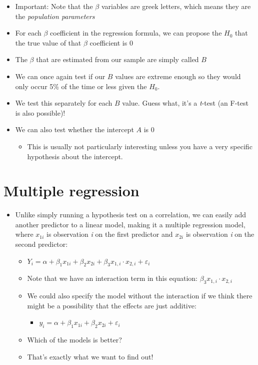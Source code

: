 \documentclass[]{article}
\providecommand{\tightlist}{%
  \setlength{\itemsep}{0pt}\setlength{\parskip}{0pt}}
\begin{document}
\begin{itemize}
\tightlist
\item
  Important: Note that the \(\beta\) variables are greek letters, which
  means they are the \emph{population parameters}
\item
  For each \(\beta\) coefficient in the regression formula, we can
  propose the \(H_0\) that the true value of that \(\beta\) coefficient
  is 0
\item
  The \(\beta\) that are estimated from our sample are simply called
  \(B\)
\item
  We can once again test if our \(B\) values are extreme enough so they
  would only occur 5\% of the time or less given the \(H_0\).
\item
  We test this separately for each \(B\) value. Guess what, it's a
  \emph{t}-test (an F-test is also possible)!
\item
  We can also test whether the intercept \(A\) is 0

  \begin{itemize}
  \tightlist
  \item
    This is usually not particularly interesting unless you have a very
    specific hypothesis about the intercept.
  \end{itemize}
\end{itemize}

\section{Multiple regression}\label{multiple-regression}

\begin{itemize}
\tightlist
\item
  Unlike simply running a hypothesis test on a correlation, we can
  easily add another predictor to a linear model, making it a multiple
  regression model, where \(x_{1i}\) is observation \emph{i} on the
  first predictor and \(x_{2i}\) is observation \emph{i} on the second
  predictor:

  \begin{itemize}
  \tightlist
  \item
    \(Y_i = \alpha + \beta_1 x_{1i} + \beta_2 x_{2i} + \beta_3 x_{1,i} \cdot x_{2,i} + \varepsilon_i\)
  \item
    Note that we have an interaction term in this equation:
    \(\beta_3 x_{1,i} \cdot x_{2,i}\)
  \item
    We could also specify the model without the interaction if we think
    there might be a possibility that the effects are just additive:

    \begin{itemize}
    \tightlist
    \item
      \(y_i = \alpha + \beta_1 x_{1i} + \beta_2 x_{2i} + \varepsilon_i\)
    \end{itemize}
  \item
    Which of the models is better?
  \item
    That's exactly what we want to find out!
  \end{itemize}
\end{itemize}
\end{document}
